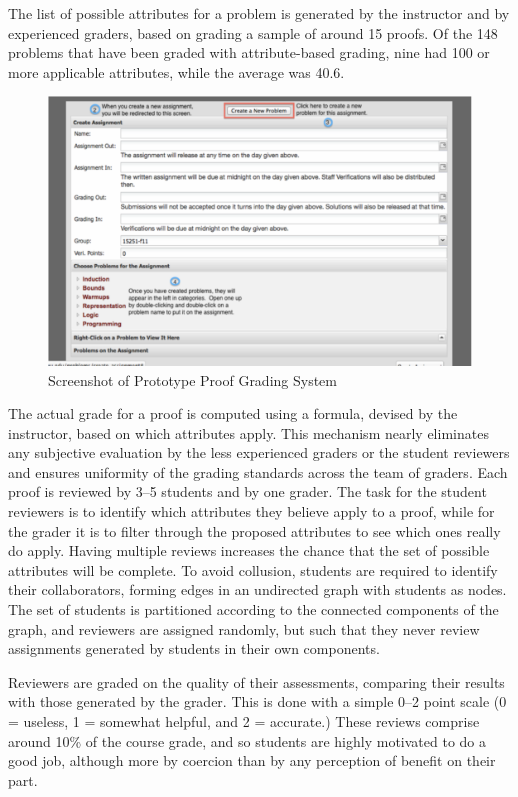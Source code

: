 \documentclass[12pt]{article}
\begin{document}
The list of possible attributes for a problem is generated by the
instructor and by experienced graders, based on grading a sample of
around 15 proofs.  Of the 148 problems that have been graded with
attribute-based grading, nine had 100 or more applicable attributes,
while the average was 40.6.  

\begin{figure}[ht]
\begin{center}
\includegraphics[scale=0.45]{screenshot-grading}
\end{center}
\caption{Screenshot of Prototype Proof Grading System}
\label{fig:screenshot}
\end{figure}

The actual grade for a proof is computed using a formula, devised
by the instructor, based on which attributes apply.  This mechanism
nearly eliminates any subjective evaluation by the less experienced graders
or the student reviewers and ensures uniformity of the grading
standards across the team of graders.  Each proof is reviewed by 3--5
students and by one grader.  The task for the student reviewers is to
identify which attributes they believe apply to a proof, while for the
grader it is to filter through the proposed attributes to see which
ones really do apply.  Having multiple reviews increases the chance
that the set of possible attributes will be complete.  To avoid
collusion, students are required to identify their collaborators,
forming edges in an undirected graph with students as nodes.  The
set of students is partitioned according to the connected components
of the graph, and
reviewers are assigned randomly, but such that they never review
assignments generated by students in their own components.

Reviewers are graded on the quality of their assessments, comparing
their results with those generated by the grader.  This is done with a
simple 0--2 point scale (0 = useless, 1 = somewhat helpful, and 2 =
accurate.)  These reviews comprise around 10\% of the course grade,
and so students are highly motivated to do a good job, although more
by coercion than by any perception of benefit on their part.
\end{document}
